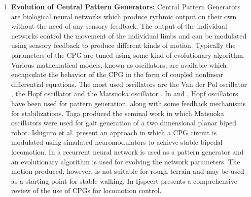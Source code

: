 \documentclass[12pt,twoside]{article}
\theoremstyle{plain}
\theoremstyle{definition}
\theoremstyle{remark}
\begin{document}
\begin{enumerate}
\item \textbf{Evolution of Central Pattern Generators: } Central Pattern Generators are biological neural networks which produce rythmic output on their own without the need of any sensory feedback. The output of the individual networks control the movement of the individual limbs and can be modulated using sensory feedback to produce different kinds of motion. Typically the parameters of the CPG are tuned using some kind of evolutionary algorithm. Various mathematical models, known as oscillators, are available which encapsulate the behavior of the CPG in the form of coupled nonlinear differential equations. The most used oscillators are the Van der Pol oscillator \cite{kanamaru2007van}, the Hopf oscillator \cite{Righetti2006} and the Matsuoka oscillator \cite{Matsuoka1985,Matsuoka1987}. In \cite{Righetti2006} and \cite{Kieboom2009}, Hopf oscillators have been used for pattern generation, along with some feedback mechanisms for stabilizations. Taga \cite{Taga1991} produced the seminal work in which Matsuoka oscillators were used for gait generation of a two dimensional planar biped robot. Ishiguro et al. \cite{Ishiguro2003} present an approach in which a CPG circuit is modulated using simulated neuromodulators to achieve stable bipedal locomotion. In \cite{reil2002evolution} a recurrent neural network is used as a pattern generator and an evolutionary algorithm is used for evolving the network parameters. The motion produced, however, is not suitable for rough terrain and may be used as a starting point for stable walking. In \cite{Ijspeert2008} Ijspeert presents a comprehensive review of the use of CPGs for locomotion control.
\end{enumerate}
\end{document}
